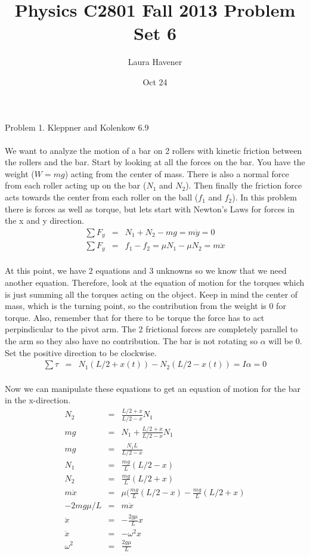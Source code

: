 \documentclass[11pt]{amsart}
\title{Physics C2801 Fall 2013 Problem Set 6}
\author{Laura Havener}
\date{Oct 24} %
\begin{document}
\maketitle

Problem 1. Kleppner and Kolenkow 6.9 \\ \\
We want to analyze the motion of a bar on 2 rollers with kinetic friction between the rollers and the bar. Start by looking at all the forces on the bar. You have the weight ($W=mg$) acting from the center of mass. There is also a normal force from each roller acting up on the bar ($N_{1}$ and $N_{2}$). Then finally the friction force acts towards the center from each roller on the ball ($f_{1}$ and $f_{2}$). In this problem there is forces as well as torque, but lets start with Newton's Laws for forces in the x and y direction. \\
\begin{eqnarray*}
\sum{F_{y}} &=& N_{1}+N_{2}-mg = m\ddot{y} = 0 \\
\sum{F_{y}} &=& f_{1}-f_{2} = \mu{}N_{1}-\mu{}N_{2} = m\ddot{x} 
\end{eqnarray*} \\
At this point, we have 2 equations and 3 unknowns so we know that we need another equation. Therefore, look at the equation of motion for the torques which is just summing all the torques acting on the object. Keep in mind the center of mass, which is the turning point, so the contribution from the weight is 0 for torque. Also, remember that for there to be torque the force has to act perpindicular to the pivot arm. The 2 frictional forces are completely parallel to the arm so they also have no contribution. The bar is not rotating so $\alpha$ will be 0. Set the positive direction to be clockwise. \\
\begin{eqnarray*}
\sum{\tau} &=& N_{1}(L/2+x(t))-N_{2}(L/2-x(t)) = I\alpha = 0 
\end{eqnarray*} \\
Now we can manipulate these equations to get an equation of motion for the bar in the x-direction. \\
\begin{eqnarray*}
N_{2} &=& \frac{L/2+x}{L/2-x}N_{1} \\
mg &=& N_{1}+\frac{L/2+x}{L/2-x}N_{1} \\
mg &=& \frac{N_{1}L}{L/2-x} \\
N_{1} &=& \frac{mg}{L}(L/2-x) \\
N_{2} &=& \frac{mg}{L}(L/2+x) \\
 m\ddot{x} &=& \mu(\frac{mg}{L}(L/2-x)-\frac{mg}{L}(L/2+x) \\
-2mg\mu/L &=& m\ddot{x} \\
\ddot{x} &=& -\frac{2g\mu}{L}x \\
\ddot{x} &=& -\omega^{2}x \\
\omega^{2}  &=&\frac{2g\mu}{L} 
\end{eqnarray*} \\
\end{document}
